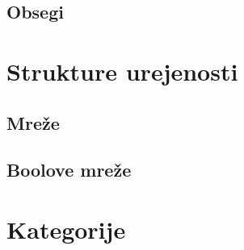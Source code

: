 \subsection{Obsegi}
\section{Strukture urejenosti}
\subsection{Mreže}
\subsection{Boolove mreže}
\section{Kategorije}


